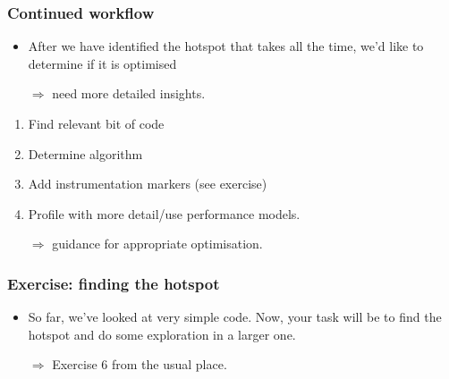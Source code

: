 \documentclass[presentation,aspectratio=43,10pt]{beamer}
\begin{document}
\begin{frame}
  \frametitle{Continued workflow}
  \begin{itemize}
  \item After we have identified the hotspot that takes all the time,
    we'd like to determine if it is optimised
  \item[$\Rightarrow$] need more detailed insights.
  \end{itemize}
  \begin{enumerate}
  \item Find relevant bit of code
  \item Determine algorithm
  \item Add instrumentation markers (see exercise)
  \item Profile with more detail/use performance models.
  \item[$\Rightarrow$] guidance for appropriate optimisation.
  \end{enumerate}
\end{frame}
\begin{frame}
  \frametitle{Exercise: finding the hotspot}
  \begin{itemize}
  \item So far, we've looked at very simple code. Now, your task will
    be to find the hotspot and do some exploration in a larger one.
  \item[$\Rightarrow$] Exercise 6 from the usual place.
  \end{itemize}
\end{frame}
\end{document}
